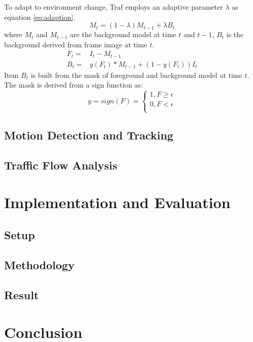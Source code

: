 \documentclass[conference]{IEEEtran}
\begin{document}
	To adapt to environment change, Traf employs an adaptive parameter $\lambda$ as equation \ref{eq:adaption}.
	\begin{equation}
	M_{t} = (1-\lambda)M_{t-1} + \lambda B_{t}
	\label{eq:adaption}
	\end{equation}
	where $M_t$ and $M_{t-1}$ are the background model at time $t$ and $t-1$, $B_{t}$ is the background derived from frame image at time $t$.
	\begin{eqnarray}	
	F_{t}=&I_{t} - M_{t-1}	\\
	B_{t}=&y(F_{t})*M_{t-1}+(1-y(F_{t}))I_{t}
	\end{eqnarray}
Item $B_{t}$ is built from the mask of foreground and background model at time $t$. The mask is derived from a sign function as:
	\begin{equation}
	  y=sign(F)=\left\{
	   \begin{aligned}
	   	1, F \geq \epsilon \\
	   	0, F < \epsilon \\
	   \end{aligned}
	   \right.
	\end{equation}		
		
	
	
	\subsection{Motion Detection and Tracking}
	
	
	
	\subsection{Traffic Flow Analysis}
	
	
	
\section{Implementation and Evaluation}
	\subsection{Setup}
	\subsection{Methodology}
	\subsection{Result}



\section{Conclusion}
\end{document}
